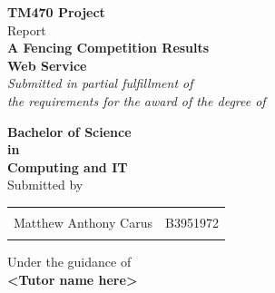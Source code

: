 \begin{titlepage}

\begin{center}

\textup{\small {\bf TM470 Project} \\ Report}\\[0.2in]

\Large \textbf {A Fencing Competition Results \\ Web Service}\\[0.5in]

       \small \emph{Submitted in partial fulfillment of\\
        the requirements for the award of the degree of}
        \vspace{.2in}

       {\bf Bachelor of Science \\in\\ Computing and IT}\\[0.3in]

\normalsize Submitted by \\
\begin{table}[h]
\centering
\begin{tabular}{lr}\hline 
\\
Matthew Anthony Carus & B3951972 \\ \\ \hline 
\end{tabular}
\end{table}

\vspace{.1in}
Under the guidance of\\
{\textbf{<Tutor name here>}}\\[0.2in]

\vfill




\end{center}
\end{titlepage}
